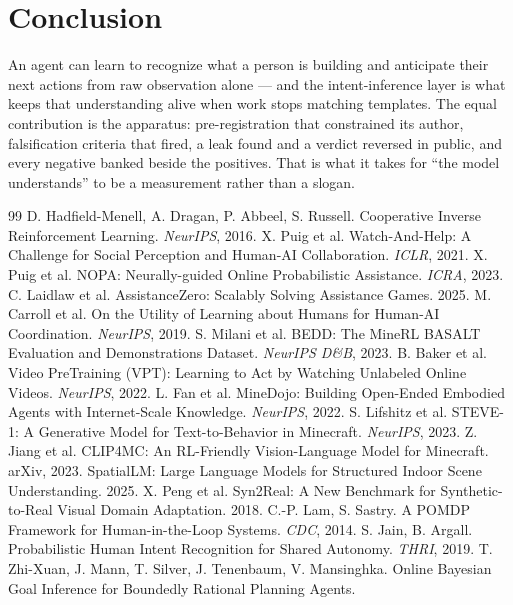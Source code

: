 \documentclass[11pt]{article}
\begin{document}
\section{Conclusion}

An agent can learn to recognize what a person is building and anticipate their
next actions from raw observation alone --- and the intent-inference layer is
what keeps that understanding alive when work stops matching templates. The
equal contribution is the apparatus: pre-registration that constrained its
author, falsification criteria that fired, a leak found and a verdict
reversed in public, and every negative banked beside the positives. That is
what it takes for ``the model understands'' to be a measurement rather than a
slogan.

\begin{thebibliography}{99}\small
{} D. Hadfield-Menell, A. Dragan, P. Abbeel, S. Russell.
Cooperative Inverse Reinforcement Learning. \emph{NeurIPS}, 2016.
 X. Puig et al. Watch-And-Help: A Challenge for Social Perception
and Human-AI Collaboration. \emph{ICLR}, 2021.
 X. Puig et al. NOPA: Neurally-guided Online Probabilistic
Assistance. \emph{ICRA}, 2023.
 C. Laidlaw et al. AssistanceZero: Scalably Solving
Assistance Games. 2025.
 M. Carroll et al. On the Utility of Learning about Humans
for Human-AI Coordination. \emph{NeurIPS}, 2019.
 S. Milani et al. BEDD: The MineRL BASALT Evaluation and
Demonstrations Dataset. \emph{NeurIPS D\&B}, 2023.
 B. Baker et al. Video PreTraining (VPT): Learning to Act by
Watching Unlabeled Online Videos. \emph{NeurIPS}, 2022.
 L. Fan et al. MineDojo: Building Open-Ended Embodied Agents
with Internet-Scale Knowledge. \emph{NeurIPS}, 2022.
 S. Lifshitz et al. STEVE-1: A Generative Model for
Text-to-Behavior in Minecraft. \emph{NeurIPS}, 2023.
 Z. Jiang et al. CLIP4MC: An RL-Friendly Vision-Language
Model for Minecraft. arXiv, 2023.
 SpatialLM: Large Language Models for Structured Indoor
Scene Understanding. 2025.
 X. Peng et al. Syn2Real: A New Benchmark for
Synthetic-to-Real Visual Domain Adaptation. 2018.
 C.-P. Lam, S. Sastry. A POMDP Framework for Human-in-the-Loop
Systems. \emph{CDC}, 2014.
 S. Jain, B. Argall. Probabilistic Human Intent
Recognition for Shared Autonomy. \emph{THRI}, 2019.
 T. Zhi-Xuan, J. Mann, T. Silver, J. Tenenbaum, V. Mansinghka.
Online Bayesian Goal Inference for Boundedly Rational Planning Agents.

\end{thebibliography}
\end{document}
